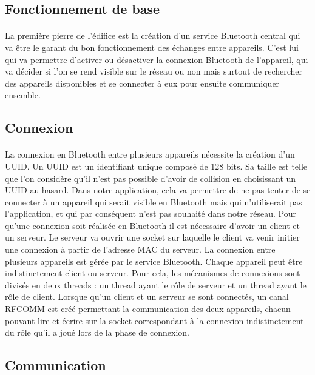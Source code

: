 \documentclass[a4paper,10pt]{report}
\begin{document}
    \subsection{Fonctionnement de base}
    \paragraph{}
    La première pierre de l'édifice est la création d'un service Bluetooth central qui va être le garant du bon fonctionnement des échanges entre appareils. C'est lui qui va permettre d'activer ou désactiver la connexion Bluetooth de l'appareil, qui va décider si l'on se rend visible sur le réseau ou non mais surtout de rechercher des appareils disponibles et se connecter à eux pour ensuite communiquer ensemble.
    
    \subsection{Connexion}
    \paragraph{}
    La connexion en Bluetooth entre plusieurs appareils nécessite la création d'un UUID. Un UUID est un identifiant unique composé de 128 bits. Sa taille est telle que l'on considère qu'il n'est pas possible d'avoir de collision en choisissant un UUID au hasard. Dans notre application, cela va permettre de ne pas tenter de se connecter à un appareil qui serait visible en Bluetooth mais qui n'utiliserait pas l'application, et qui par conséquent n'est pas souhaité dans notre réseau.
    Pour qu'une connexion soit réalisée en Bluetooth il est nécessaire d'avoir un client et un serveur. Le serveur va ouvrir une socket sur laquelle le client va venir initier une connexion à partir de l'adresse MAC du serveur.
    La connexion entre plusieurs appareils est gérée par le service Bluetooth. Chaque appareil peut être indistinctement client ou serveur. Pour cela, les mécanismes de connexions sont divisés en deux threads : un thread ayant le rôle de serveur et un thread ayant le rôle de client.
    Lorsque qu'un client et un serveur se sont connectés, un canal RFCOMM est créé permettant la communication des deux appareils, chacun pouvant lire et écrire sur la socket correspondant à la connexion indistinctement du rôle qu'il a joué lors de la phase de connexion.
    
    \subsection{Communication}
\end{document}
